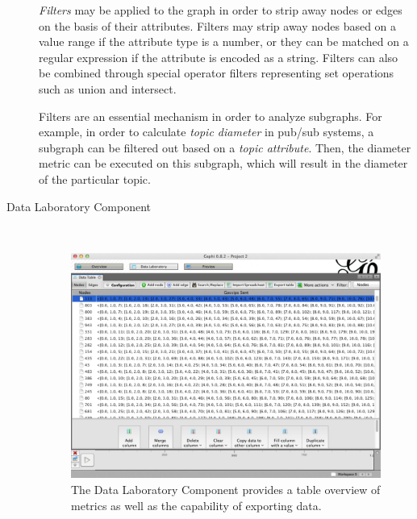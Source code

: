 \begin{description}
    \emph{Filters} may be applied to the graph in order to strip away
    nodes or edges on the basis of their attributes. Filters may strip
    away nodes based on a value range if the attribute type is a number,
    or they can be matched on a regular expression if the attribute is
    encoded as a string. Filters can also be combined through special
    operator filters representing set operations such as union and
    intersect.

    Filters are an essential mechanism in order to analyze subgraphs.
    For example, in order to calculate \emph{topic diameter} in pub/sub systems,
    a subgraph can be filtered out based on a \emph{topic attribute}. Then, the
    diameter metric can be executed on this subgraph, which will result
    in the diameter of the particular topic.

\item[Data Laboratory Component] \hfill \\

    \begin{figure}[h!]
        \centering
        \includegraphics[width=\linewidth]{figures/gui_data_lab}
        \caption{The Data Laboratory Component provides a table overview
        of metrics as well as the capability of exporting data.}
        \label{fig:data_lab}
    \end{figure}


\end{description}
